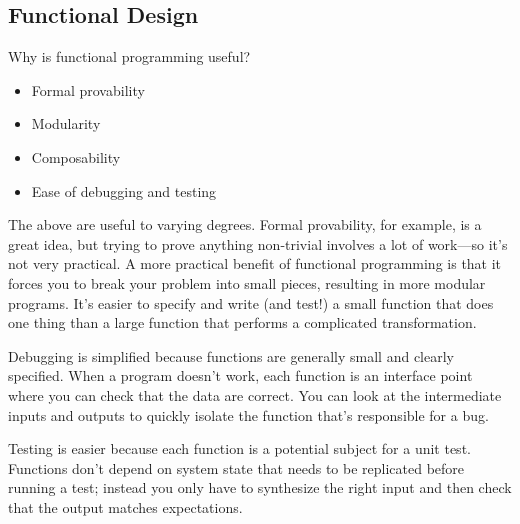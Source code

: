 \documentclass[ignorenonframetext,red]{beamer}
\begin{document}
\subsection{Functional Design}
\begin{frame}
\noindent Why is functional programming useful?
\begin{itemize}
\pause \item Formal provability
\pause \item Modularity
\pause \item Composability
\pause \item Ease of debugging and testing
\end{itemize}
\end{frame}

\noindent The above are useful to varying degrees. Formal provability, for example, is a great idea, but trying to prove anything non-trivial involves a lot of work---so it's not very practical. A more practical benefit of functional programming is that it forces you to break your problem into small pieces, resulting in more modular programs.  It’s easier to specify and write (and test!) a small function that does one thing than a large function that performs a complicated transformation.

Debugging is simplified because functions are generally small and clearly specified. When a program doesn’t work, each function is an interface point where you can check that the data are correct. You can look at the intermediate inputs and outputs to quickly isolate the function that’s responsible for a bug.

Testing is easier because each function is a potential subject for a unit test. Functions don’t depend on system state that needs to be replicated before running a test; instead you only have to synthesize the right input and then check that the output matches expectations.
\end{document}
